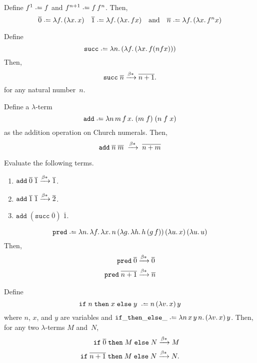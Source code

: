 \begin{definition}
  Define $f^1 \defeq f$ and $f^{n+1} \defeq f\,f^n$. Then, 
  \[
    \overline{0} \defeq \lambda f.\, (\lambda x.\, x)
    \quad
    \overline{1} \defeq \lambda f.\, (\lambda x.\, f x)
    \quad\text{and}\quad
    \overline{n} \defeq \lambda f.\, (\lambda x.\, f^{n} x)
  \] 
\end{definition}

\begin{definition}[Successor]
  Define
  \[
    \mathtt{succ} \defeq \lambda n.\, (\lambda f.\, (\lambda x.\, f(n f x)))
  \]
  Then,
  \[
    \mathtt{succ}\;\overline{n} \xrightarrow{\beta*} \overline{n+1}.
  \]
  for any natural number~$n$.
\end{definition}
\begin{proposition}[Addition]
  Define a $\lambda$-term 
  \[
    \mathtt{add} \defeq \lambda n\,m\,f\,x.\; (m\;f)\;(n\;f\;x) 
  \]
  as the addition operation on Church numerals.
  Then, 
  \[
    \mathtt{add}\;\overline{n}\;\overline{m}\;
    \xrightarrow{\beta*}\;\overline{n + m}
  \]
\end{proposition}
\begin{example}
  Evaluate the following terms.
  \begin{enumerate}
    \item $\mathtt{add}\;\overline{0}\;\overline{1}
      \xrightarrow{\beta*} \overline{1}$.
    \item $\mathtt{add}\;\overline{1}\;\overline{1}
      \xrightarrow{\beta*} \overline{2}$.
    \item $\mathtt{add}\;(\mathtt{succ}\;\overline{0})\;\overline{1}$.
    \end{enumerate}
\end{example}
\begin{proposition}[Predecessor]
  \[
    \mathtt{pred} \defeq \lambda n.\,\lambda f.\,\lambda x.\,n\,(\lambda g.\,\lambda h.\,h\,(g\,f))\,
    (\lambda u.\,x)\,(\lambda u.\,u)
  \]
  Then,
  \begin{align*}
      \mathtt{pred}\;\overline{0}   & \xrightarrow{\beta*} \overline{0} \\
    \mathtt{pred}  \;\overline{n+1} & \xrightarrow{\beta*} \overline{n}
  \end{align*}
\end{proposition}

\begin{proposition}[Conditional]
  Define 
  \[
    \mathtt{if}\;n\;\mathtt{then}\;x\;\mathtt{else}\;y\; \defeq 
    n\,(\lambda v.\,x)\,y 
  \]
  where $n$, $x$, and $y$ are variables and 
  $\mathtt{if\_then\_else\_} \defeq \lambda n\,x\,y\,n.\,(\lambda v.\, x)\, y$.
  Then, for any two $\lambda$-terms $M$ and~$N$,
  \begin{align*}
    \mathtt{if}\;\overline{0}\;\mathtt{then}\;M\;\mathtt{else}\;N
    \xrightarrow{\beta*} M \\ 
    \mathtt{if}\;\overline{n+1}\;\mathtt{then}\;M\;\mathtt{else}\;N
    \xrightarrow{\beta*} N.
  \end{align*}
\end{proposition}
